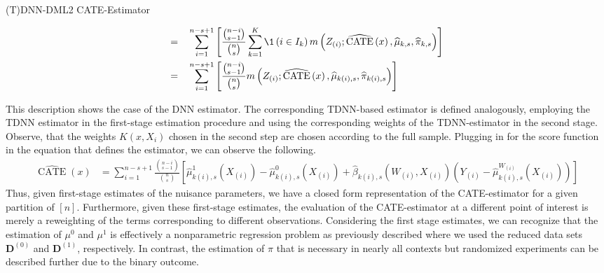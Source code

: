 \begin{boxD}
\begin{dfn}{(T)DNN-DML2 CATE-Estimator}
\begin{enumerate}
\begin{equation}
\begin{aligned}
					      = \quad         & \sum_{i = 1}^{n - s + 1} \left[\frac{\binom{n-i}{s-1}}{\binom{n}{s}} \sum_{k = 1}^{K} \1\left(i \in I_{k}\right)  m\left(Z_{(i)}; \widehat{\operatorname{CATE}}\left(x\right), \hat{\mu}_{k,s}, \hat{\pi}_{k,s}\right)\right] \\
					      = \quad         & \sum_{i = 1}^{n - s + 1} \left[\frac{\binom{n-i}{s-1}}{\binom{n}{s}} m\left(Z_{(i)}; \widehat{\operatorname{CATE}}\left(x\right), \hat{\mu}_{k(i),s}, \hat{\pi}_{k(i),s}\right)\right]
				      \end{aligned}
			      \end{equation}
		\end{enumerate}
	\end{dfn}
\end{boxD}
This description shows the case of the DNN estimator.
The corresponding TDNN-based estimator is defined analogously, employing the TDNN estimator in the first-stage estimation procedure and using the corresponding weights of the TDNN-estimator in the second stage.
Observe, that the weights $K(x, X_{i})$ chosen in the second step are chosen according to the full sample.
Plugging in for the score function in the equation that defines the estimator, we can observe the following.
\begin{equation}
	\begin{aligned}
		\widehat{\operatorname{CATE}}\left(x\right) & = \sum_{i = 1}^{n - s + 1} \frac{\binom{n-i}{s-1}}{\binom{n}{s}}
		\left[\hat{\mu}_{k(i),s}^{1}\left(X_{(i)}\right) - \hat{\mu}_{k(i),s}^{0}\left(X_{(i)}\right) + \hat{\beta}_{k(i),s}\left(W_{(i)}, X_{(i)}\right)\left(Y_{(i)} - \hat{\mu}^{W_{(i)}}_{k(i),s}\left(X_{(i)}\right)\right)\right]
	\end{aligned}
\end{equation}
Thus, given first-stage estimates of the nuisance parameters, we have a closed form representation of the CATE-estimator for a given partition of $[n]$.
Furthermore, given these first-stage estimates, the evaluation of the CATE-estimator at a different point of interest is merely a reweighting of the terms corresponding to different observations.
Considering the first stage estimates, we can recognize that the estimation of $\mu^{0}$ and $\mu^{1}$ is effectively a nonparametric regression problem as previously described where we used the reduced data sets $\mathbf{D}^{(0)}$ and $\mathbf{D}^{(1)}$, respectively.
In contrast, the estimation of $\pi$ that is necessary in nearly all contexts but randomized experiments can be described further due to the binary outcome.
